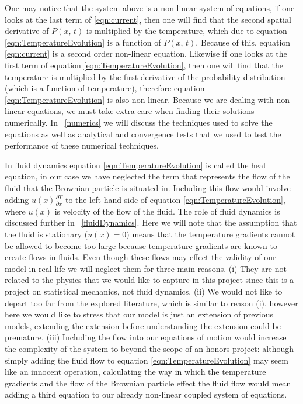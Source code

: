 One may notice that the system above is a non-linear system of equations, if one looks at the last term of \ref{eqn:current}, then one will find that the second spatial derivative of $P(x, \, t)$ is multiplied by the temperature, which due to equation \ref{eqn:TemperatureEvolution} is a function of $P(x, \, t)$. Because of this, equation \ref{eqn:current} is a second order non-linear equation. Likewise if one looks at the first term of equation \ref{eqn:TemperatureEvolution}, then one will find that the temperature is multiplied by the first derivative of the probability distribution (which is a function of temperature), therefore equation \ref{eqn:TemperatureEvolution} is also non-linear. Because we are dealing with non-linear equations, we must take extra care when finding their solutions numerically. In ~\autoref{numerics} we will discuss the techniques used to solve the equations as well as analytical and convergence tests that we used to test the performance of these numerical techniques.

In fluid dynamics equation \ref{eqn:TemperatureEvolution} is called the heat equation, in our case we have neglected the term that represents the flow of the fluid that the Brownian particle is situated in. Including this flow would involve adding $u(x) \frac{\partial T}{\partial x}$ to the left hand side of equation \ref{eqn:TemperatureEvolution}, where $u(x)$ is velocity of the flow of the fluid. The role of fluid dynamics is discussed further in ~\autoref{fluidDynamics}. Here we will note that the assumption that the fluid is stationary ($u(x) = 0$) means that the temperature gradients cannot be allowed to become too large because temperature gradients are known to create flows in fluids. Even though these flows may effect the validity of our model in real life we will neglect them for three main reasons. (i) They are not related to the physics that we would like to capture in this project since this is a project on statistical mechanics, not fluid dynamics. (ii) We would not like to depart too far from the explored literature, which is similar to reason (i), however here we would like to stress that our model is just an extension of previous models, extending the extension before understanding the extension could be premature. (iii) Including the flow into our equations of motion would increase the complexity of the system to beyond the scope of an honors project: although simply adding the fluid flow to equation \ref{eqn:TemperatureEvolution} may seem like an innocent operation, calculating the way in which the temperature gradients and the flow of the Brownian particle effect the fluid flow would mean adding a third equation to our already non-linear coupled system of equations.

